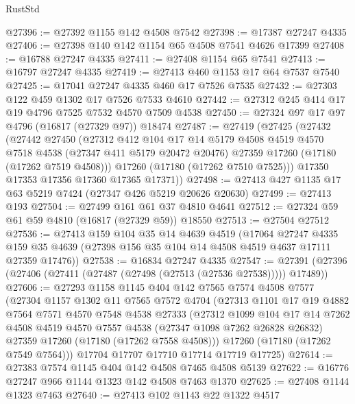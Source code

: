 \begin{lexlean}{RustStd}
\begin{coremodule}
{\begin{coremodule}
{{{{{{{{{{{{{{{{{{{{{{{{{{{{{{{{{{{{{{{{{{{{{{{{{{{{{{{@27396 := @27392 @1155 @142 @4508 @7542
@27398 := @17387 @27247 @4335
@27406 := @27398 @140 @142 @1154 @65 @4508 @7541 @4626 @17399
@27408 := @16788 @27247 @4335
@27411 := @27408 @1154 @65 @7541
@27413 := @16797 @27247 @4335
@27419 := @27413 @460 @1153 @17 @64 @7537 @7540
@27425 := @17041 @27247 @4335 @460 @17 @7526 @7535
@27432 := @27303 @122 @459 @1302 @17 @7526 @7533 @4610
@27442 := @27312 @245 @414 @17 @19 @4796 @7525 @7532 @4570 @7509 @4538
@27450 := @27324 @97 @17 @97 @4796 (@16817 (@27329 @97)) @18474
@27487 := @27419
    (@27425
      (@27432
        (@27442
          @27450
          (@27312
            @412
            @104
            @17
            @14
            @5179
            @4508
            @4519
            @4570
            @7518
            @4538
            (@27347 @411 @5179 @20472 @20476)
            @27359
            @17260
            (@17180 (@17262 @7519 @4508)))
          @17260
          (@17180 (@17262 @7510 @7525)))
        @17350
        @17353
        @17356
        @17360
        @17365
        @17371))
@27498 := @27413 @427 @1135 @17 @63 @5219 @7424 (@27347 @426 @5219 @20626 @20630)
@27499 := @27413 @193
@27504 := @27499 @161 @61 @37 @4810 @4641
@27512 := @27324 @59 @61 @59 @4810 (@16817 (@27329 @59)) @18550
@27513 := @27504 @27512
@27536 := @27413
    @159
    @104
    @35
    @14
    @4639
    @4519
    (@17064
      @27247
      @4335
      @159
      @35
      @4639
      (@27398 @156 @35 @104 @14 @4508 @4519 @4637 @17111 @27359 @17476))
@27538 := @16834 @27247 @4335
@27547 := @27391 (@27396 (@27406 (@27411 (@27487 (@27498 (@27513 (@27536 @27538))))) @17489))
@27606 := @27293
    @1158
    @1145
    @404
    @142
    @7565
    @7574
    @4508
    @7577
    (@27304
      @1157
      @1302
      @11
      @7565
      @7572
      @4704
      (@27313
        @1101
        @17
        @19
        @4882
        @7564
        @7571
        @4570
        @7548
        @4538
        @27333
        (@27312
          @1099
          @104
          @17
          @14
          @7262
          @4508
          @4519
          @4570
          @7557
          @4538
          (@27347 @1098 @7262 @26828 @26832)
          @27359
          @17260
          (@17180 (@17262 @7558 @4508)))
        @17260
        (@17180 (@17262 @7549 @7564)))
      @17704
      @17707
      @17710
      @17714
      @17719
      @17725)
@27614 := @27383 @7574 @1145 @404 @142 @4508 @7465 @4508 @5139
@27622 := @16776 @27247 @966 @1144 @1323 @142 @4508 @7463 @1370
@27625 := @27408 @1144 @1323 @7463
@27640 := @27413
    @102
    @1143
    @22
    @1322
    @4517
}}}}}}}}}}}}}}}}}}}}}}}}}}}}}}}}}}}}}}}}}}}}}}}}}}}}}}}
\end{coremodule}}
\end{coremodule}
\end{lexlean}
